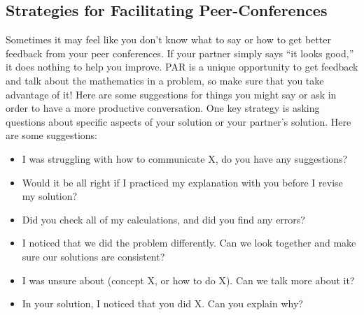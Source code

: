 \documentclass[letter]{article}
\begin{document}
	\subsection*{Strategies for Facilitating Peer-Conferences}
	Sometimes it may feel like you don't know what to say or how to get better feedback from your peer
	conferences. If your partner simply says ``it looks good,''
	it does nothing to help you improve. PAR is a
	unique opportunity to get feedback and talk about the mathematics in a problem, so make sure that you
	take advantage of it!
	Here are some suggestions for things you might say or ask in order to have a more productive 
	conversation. One key strategy is asking questions about specific aspects of your solution or your partner's
	solution. Here are some suggestions:
	\begin{itemize}
		\item I was struggling with how to communicate X, do you have any suggestions?
		\item Would it be all right if I practiced my explanation with you before I revise my solution?
		\item Did you check all of my calculations, and did you find any errors?
		\item I noticed that we did the problem differently. Can we look together and make sure our solutions are
		consistent?
		\item I was unsure about (concept X, or how to do X). Can we talk more about it?
		\item In your solution, I noticed that you did X. Can you explain why?
	\end{itemize}
\end{document}
